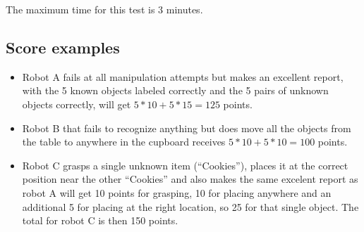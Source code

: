 
The maximum time for this test is 3 minutes.

\begin{scorelist}





	

	
\end{scorelist}

\subsection{Score examples} 
\begin{itemize}
 \item Robot A fails at all manipulation attempts but makes an excellent report, with the 5 known objects labeled correctly and the 5 pairs of unknown objects correctly, will get 
$5*10 + 5*15 = 125$ points. 
 \item Robot B that fails to recognize anything but does move all the objects from the table to anywhere in the cupboard receives $5*10 + 5*10 = 100$ points.
 \item Robot C grasps a single unknown item (``Cookies''), places it at the correct position near the other ``Cookies'' and also makes the same excelent report as robot A will get 
10 points for grasping, 10 for placing anywhere and an additional 5 for placing at the right location, so 25 for that single object.
The  total for robot C is then 150 points.
\end{itemize} 



